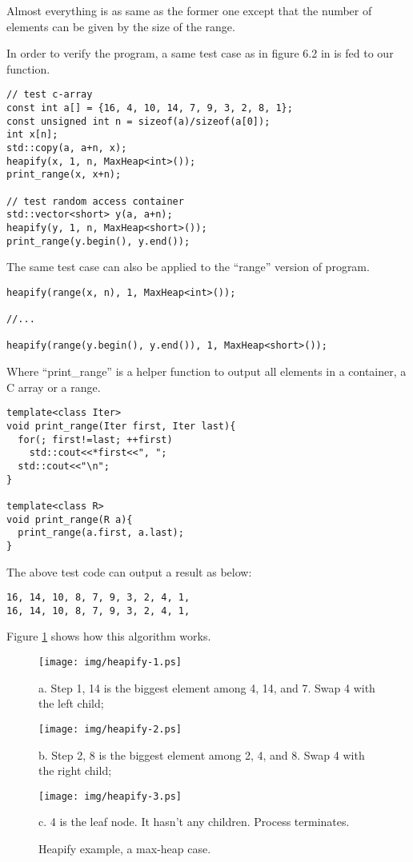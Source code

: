 \documentclass{article}
\begin{document}
Almost everything is as same as the former one except that the number
of elements can be given by the size of the range.

In order to verify the program, a same test case as in figure 6.2 in \cite{CLRS}
is fed to our function.

\begin{lstlisting}
// test c-array
const int a[] = {16, 4, 10, 14, 7, 9, 3, 2, 8, 1};
const unsigned int n = sizeof(a)/sizeof(a[0]);
int x[n];
std::copy(a, a+n, x);
heapify(x, 1, n, MaxHeap<int>());
print_range(x, x+n);

// test random access container
std::vector<short> y(a, a+n);
heapify(y, 1, n, MaxHeap<short>());
print_range(y.begin(), y.end());
\end{lstlisting}

The same test case can also be applied to the ``range'' version of
program.

\begin{lstlisting}
heapify(range(x, n), 1, MaxHeap<int>());

//...

heapify(range(y.begin(), y.end()), 1, MaxHeap<short>());
\end{lstlisting}

Where ``print\_range'' is a helper function to output all elements
in a container, a C array or a range.

\begin{lstlisting}
template<class Iter>
void print_range(Iter first, Iter last){
  for(; first!=last; ++first)
    std::cout<<*first<<", ";
  std::cout<<"\n";
}

template<class R>
void print_range(R a){
  print_range(a.first, a.last);
}
\end{lstlisting}

The above test code can output a result as below:

\begin{verbatim}
16, 14, 10, 8, 7, 9, 3, 2, 4, 1, 
16, 14, 10, 8, 7, 9, 3, 2, 4, 1,
\end{verbatim}

Figure \ref{fig:heapify} shows how this algorithm works.

\begin{figure}[htbp]
  \begin{center}
    \texttt{[image: img/heapify-1.ps]}

    a. Step 1, 14 is the biggest element among 4, 14, and 7. Swap 4 with the left child;

    \texttt{[image: img/heapify-2.ps]}

    b. Step 2, 8 is the biggest element among 2, 4, and 8. Swap 4 with the right child;

    \texttt{[image: img/heapify-3.ps]}

    c. 4 is the leaf node. It hasn't any children. Process terminates.
    \caption{Heapify example, a max-heap case.} \label{fig:heapify}
  \end{center}
\end{figure}
\end{document}
